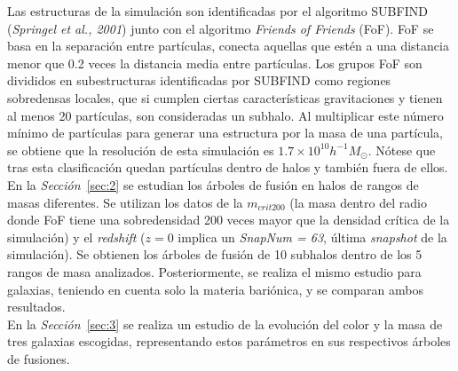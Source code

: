 Las estructuras de la simulación son identificadas por el algoritmo SUBFIND (\textit{Springel et al., 2001}\cite{8}) junto con el algoritmo \textit{Friends of Friends} (FoF). FoF se basa en la separación entre partículas, conecta aquellas que estén a una distancia menor que 0.2 veces la distancia media entre partículas. Los grupos FoF son divididos en subestructuras identificadas por SUBFIND como regiones sobredensas locales, que si cumplen ciertas características gravitaciones y tienen al menos 20 partículas, son consideradas un subhalo. Al multiplicar este número mínimo de partículas para generar una estructura por la masa de una partícula, se obtiene que la resolución de esta simulación es $1.7\times 10^{10}h^{-1}M_\odot$. Nótese que tras esta clasificación quedan partículas dentro de halos y también fuera de ellos. \\ 

En la \textit{Sección}~\ref{sec:2} se estudian los árboles de fusión en halos de rangos de masas diferentes. Se utilizan los datos de la $m_{crit200}$ (la masa dentro del radio donde FoF tiene una sobredensidad 200 veces mayor que la densidad crítica de la simulación) y el \textit{redshift} ($z=0$ implica un \textit{SnapNum = 63}, última \textit{snapshot} de la simulación). Se obtienen los árboles de fusión de 10 subhalos dentro de los 5 rangos de masa analizados. Posteriormente, se realiza el mismo estudio para galaxias, teniendo en cuenta solo la materia bariónica, y se comparan ambos resultados.\\ 

En la \textit{Sección}~\ref{sec:3} se realiza un estudio de la evolución del color y la masa de tres galaxias escogidas, representando estos parámetros en sus respectivos árboles de fusiones. 

 























